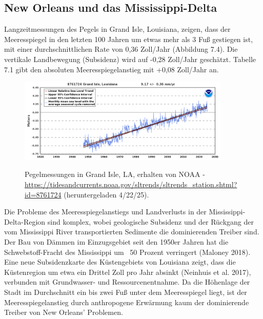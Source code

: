 \documentclass[12pt,paper=a4,DIV=12,parskip=never,chapterprefix=false,headings=standardclasses]{scrreprt}
\begin{document}
\subsection{New Orleans und das Mississippi-Delta}
Langzeitmessungen des Pegels in Grand Isle, Louisiana, zeigen, dass der Meeresspiegel in den letzten 100 Jahren um etwas mehr als 3 Fuß gestiegen ist, mit einer durchschnittlichen Rate von 0,36 Zoll/Jahr (Abbildung 7.4).
Die vertikale Landbewegung (Subsidenz) wird auf -0,28 Zoll/Jahr geschätzt. Tabelle 7.1 gibt den absoluten Meeresspiegelanstieg mit +0,08 Zoll/Jahr an.

\begin{figure}[H]
\begin{center}
\includegraphics[width=0.9\textwidth]{bilder/bilderKlima-0071.png}\\[1cm]
\end{center}
\caption{Pegelmessungen in Grand Isle, LA, erhalten von NOAA - \url{https://tidesandcurrents.noaa.gov/sltrends/sltrends_station.shtml?id=8761724} (heruntergeladen 4/22/25).}
\end{figure}

Die Probleme des Meeresspiegelanstiegs und Landverlusts in der Mississippi-Delta-Region sind komplex, wobei geologische Subsidenz und der Rückgang der vom Mississippi River transportierten Sedimente die dominierenden Treiber sind. Der Bau von Dämmen im Einzugsgebiet seit den 1950er Jahren hat die Schwebstoff-Fracht des Mississippi um ~50 Prozent verringert (Maloney 2018). Eine neue Subsidenzkarte des Küstengebiets von Louisiana zeigt, dass die Küstenregion um etwa ein Drittel Zoll pro Jahr absinkt (Neinhuis et al. 2017), verbunden mit Grundwasser- und Ressourcenentnahme. Da die Höhenlage der Stadt im Durchschnitt ein bis zwei Fuß unter dem Meeresspiegel liegt, ist der Meeresspiegelanstieg durch anthropogene Erwärmung kaum der dominierende Treiber von New Orleans' Problemen.
\end{document}

